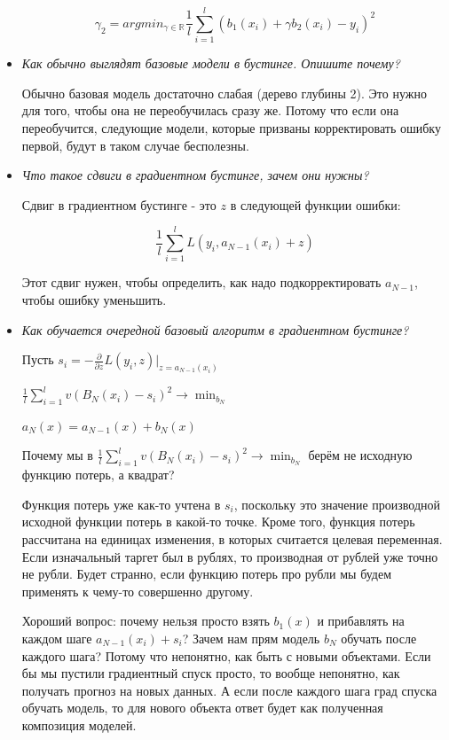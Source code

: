\documentclass[a4paper]{article}
\begin{document}
\begin{itemize}
\[ \gamma_2 = argmin_{\gamma \in \mathbb{R}} \frac{1}{l} \sum_{i=1}^l \left( b_1(x_i) + \gamma b_2(x_i) - y_i \right)^2 \]


\item \textit{ Как обычно выглядят базовые модели в бустинге. Опишите почему?}

Обычно базовая модель достаточно слабая (дерево глубины 2). Это нужно для того, чтобы она не переобучилась сразу же. Потому что если она переобучится, следующие модели, которые призваны корректировать ошибку первой, будут в таком случае бесполезны.

\item \textit{Что такое сдвиги в градиентном бустинге, зачем они нужны?}

Сдвиг в градиентном бустинге - это $z$ в следующей функции ошибки:

\[ \frac{1}{l} \sum_{i=1}^l L(y_i, a_{N-1}(x_i)+ z) \]

Этот сдвиг нужен, чтобы определить, как надо подкорректировать $a_{N-1}$, чтобы ошибку уменьшить.

\item \textit{Как обучается очередной базовый алгоритм в градиентном бустинге?}

Пусть $s_i = - \frac{\partial}{\partial z} L(y_i, z) |_{z=a_{N-1}(x_i)}$

$\frac{1}{l} \sum_{i=1}^lv(B_N(x_i) - s_i)^2 \rightarrow \min_{b_N}$

$a_N(x) = a_{N-1} (x) + b_N(x)$


Почему мы в $\frac{1}{l} \sum_{i=1}^lv(B_N(x_i) - s_i)^2 \rightarrow \min_{b_N}$ берём не исходную функцию потерь, а квадрат?

Функция потерь уже как-то учтена в $s_i$, поскольку это значение производной исходной функции потерь в какой-то точке. Кроме того, функция потерь рассчитана на единицах изменения, в которых считается целевая переменная. Если изначальный таргет был в рублях, то производная от рублей уже точно не рубли. Будет странно, если функцию потерь про рубли мы будем применять к чему-то совершенно другому.

Хороший вопрос: почему нельзя просто взять $b_1(x)$ и прибавлять на каждом шаге $a_{N-1} (x_i) + s_i$? Зачем нам прям модель $b_N$ обучать после каждого шага? Потому что непонятно, как быть с новыми объектами. Если бы мы пустили градиентный спуск просто, то вообще непонятно, как получать прогноз на новых данных. А если после каждого шага град спуска обучать модель, то для нового объекта ответ будет как полученная композиция моделей.


\end{itemize}
\end{document}
